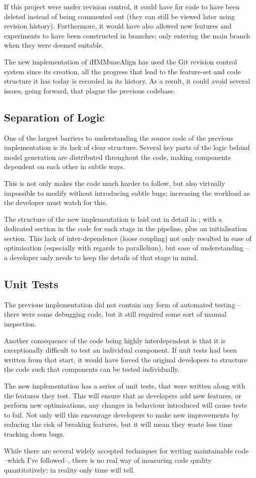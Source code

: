 If this project were under revision control, it could have for code to have been deleted instead of being commented out (they can still be viewed later using revision history). Furthermore, it would have also allowed new features and experiments to have been constructed in branches; only entering the main branch when they were deemed suitable.

The new implementation of iHMMuneAlign has used the Git revision control system since its creation, all the progress that lead to the feature-set and code structure it has today is recorded in its history. As a result, it could avoid several issues, going forward, that plague the previous codebase.

\leavevmode
\subsection{Separation of Logic}
One of the largest barriers to understanding the source code of the previous implementation is its lack of clear structure. Several key parts of the logic behind model generation are distributed throughout the code, making components dependent on each other in subtle ways. 

This is not only makes the code much harder to follow, but also virtually impossible to modify without introducing subtle bugs; increasing the workload as the developer must watch for this.

The structure of the new implementation is laid out in detail in ; with a dedicated section in the code for each stage in the pipeline, plus an initialisation section. This lack of inter-dependence (loose coupling) not only resulted in ease of optimisation (especially with regards to parallelism), but ease of understanding -- a developer only needs to keep the details of that stage in mind.
	
\subsection{Unit Tests}
The previous implementation did not contain any form of automated testing -- there were some debugging code, but it still required some sort of manual inspection.

Another consequence of the code being highly interdependent is that it is exceptionally difficult to test an individual component. If unit tests had been written from that start, it would have forced the original developers to structure the code such that components can be tested individually.

The new implementation has a series of unit tests, that were written along with the features they test. This will ensure that as developers add new features, or perform new optimisations, any changes in behaviour introduced will cause tests to fail. Not only will this encourage developers to make new improvements by reducing the risk of breaking features, but it will mean they waste less time tracking down bugs.


While there are several widely accepted techniques for writing maintainable code --which I've followed--, there is no real way of measuring code quality quantitatively; in reality only time will tell.
